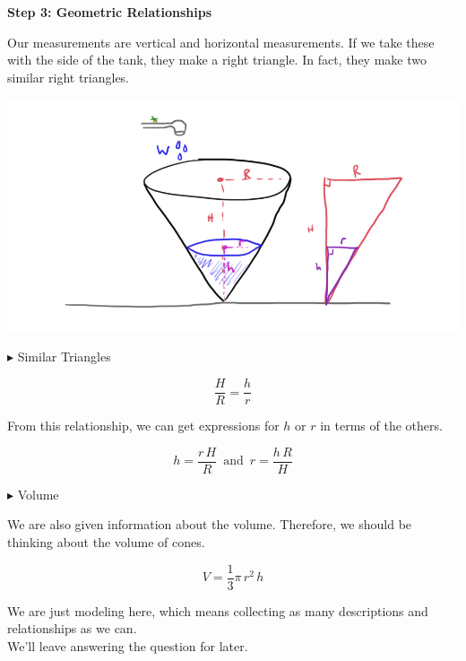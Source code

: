 \documentclass{ximera}
\begin{document}
\textbf{\textcolor{purple!85!blue}{Step 3: Geometric Relationships}}


Our measurements are vertical and horizontal measurements.  If we take these with the side of the tank, they make a right triangle.  In fact, they make two similar right triangles.






\begin{image}
\includegraphics{pics/cone_5.png}
\end{image}




$\blacktriangleright$ Similar Triangles



\[
\frac{H}{R} = \frac{h}{r}
\]


From this relationship, we can get expressions for $h$ or $r$ in terms of the others. 



\[
h = \frac{r \, H}{R} \, \text{ and } \,  r = \frac{h \, R}{H}
\]







$\blacktriangleright$ Volume


We are also given information about the volume.  Therefore, we should be thinking about the volume of cones.

\[

V = \frac{1}{3} \pi \, r^2 \, h
\]







We are just modeling here, which means collecting as many descriptions and relationships as we can. \\

We'll leave answering the question for later.
\end{document}
